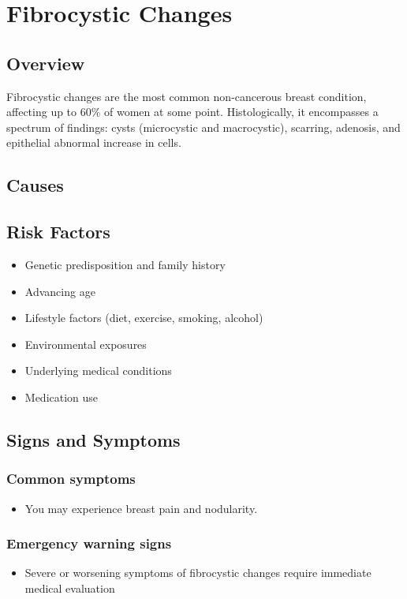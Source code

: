\chapter{Fibrocystic Changes}
\label{sec:Fibrocystic Changes}

\section{Overview}
Fibrocystic changes are the most common non-cancerous breast condition, affecting up to 60\% of women at some point. Histologically, it encompasses a spectrum of findings: cysts (microcystic and macrocystic), scarring, adenosis, and epithelial abnormal increase in cells.
\section{Causes}
\section{Risk Factors}

\begin{itemize}[noitemsep]
  \item Genetic predisposition and family history
  \item Advancing age
  \item Lifestyle factors (diet, exercise, smoking, alcohol)
  \item Environmental exposures
  \item Underlying medical conditions
  \item Medication use
\end{itemize}
\section{Signs and Symptoms}

\subsection{Common symptoms}
\begin{itemize}[noitemsep]
  \item You may experience breast pain and nodularity. 
  \end{itemize}

\subsection{Emergency warning signs}
\begin{itemize}[noitemsep]
  \item Severe or worsening symptoms of fibrocystic changes require immediate medical evaluation
\end{itemize}
